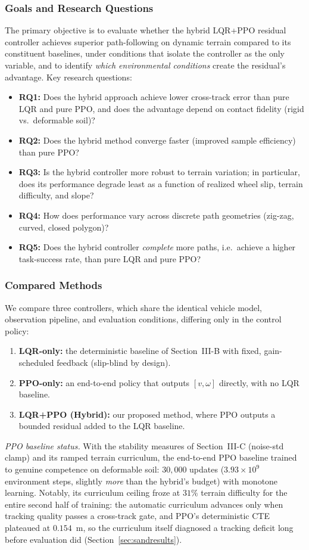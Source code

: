 \documentclass[conference]{IEEEtran}
\begin{document}
\subsubsection{Goals and Research Questions}
The primary objective is to evaluate whether the hybrid LQR{+}PPO residual controller achieves superior path-following on dynamic terrain compared to its constituent baselines, under conditions that isolate the controller as the only variable, and to identify \emph{which environmental conditions} create the residual's advantage. Key research questions:
\begin{itemize}
\item \textbf{RQ1:} Does the hybrid approach achieve lower cross-track error than pure LQR and pure PPO, and does the advantage depend on contact fidelity (rigid vs.\ deformable soil)?
\item \textbf{RQ2:} Does the hybrid method converge faster (improved sample efficiency) than pure PPO?
\item \textbf{RQ3:} Is the hybrid controller more robust to terrain variation; in particular, does its performance degrade least as a function of realized wheel slip, terrain difficulty, and slope?
\item \textbf{RQ4:} How does performance vary across discrete path geometries (zig-zag, curved, closed polygon)?
\item \textbf{RQ5:} Does the hybrid controller \emph{complete} more paths, i.e.\ achieve a higher task-success rate, than pure LQR and pure PPO?
\end{itemize}

\subsubsection{Compared Methods}
We compare three controllers, which share the identical vehicle model, observation pipeline, and evaluation conditions, differing only in the control policy:
\begin{enumerate}
\item \textbf{LQR-only:} the deterministic baseline of Section~III-B with fixed, gain-scheduled feedback (slip-blind by design).
\item \textbf{PPO-only:} an end-to-end policy that outputs $[v,\omega]$ directly, with no LQR baseline.
\item \textbf{LQR{+}PPO (Hybrid):} our proposed method, where PPO outputs a bounded residual added to the LQR baseline.
\end{enumerate}
\noindent\emph{PPO baseline status.} With the stability measures of Section~III-C (noise-std clamp) and its ramped terrain curriculum, the end-to-end PPO baseline trained to genuine competence on deformable soil: $30{,}000$ updates ($3.93\times10^{9}$ environment steps, slightly \emph{more} than the hybrid's budget) with monotone learning. Notably, its curriculum ceiling froze at $31\%$ terrain difficulty for the entire second half of training: the automatic curriculum advances only when tracking quality passes a cross-track gate, and PPO's deterministic CTE plateaued at $0.154$~m, so the curriculum itself diagnosed a tracking deficit long before evaluation did (Section~\ref{sec:sandresults}).
\end{document}
